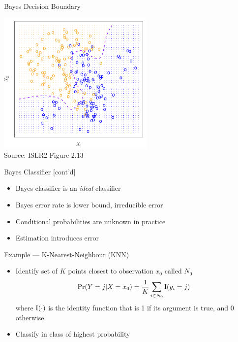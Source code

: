 \documentclass[ignorenonframetext,xcolor=x11names]{beamer}
\begin{document}
\begin{frame}{Bayes Decision Boundary}

\centering
\includegraphics[height=2.75in]{Figures_Chapters_1-6/Chapter2/2_13.pdf} \\
\vspace{3mm}
\scriptsize Source: ISLR2 Figure 2.13
\end{frame}

\begin{frame}{Bayes Classifier \small [cont'd]}
\begin{itemize}
\item Bayes classifier is an \emph{ideal} classifier
\item Bayes error rate is lower bound, irreducible error
\item Conditional probabilities are unknown in practice
\item Estimation introduces error
\end{itemize}
\end{frame}


\begin{frame}{Example --- K-Nearest-Neighbour (KNN)}
\begin{itemize}
  \item Identify set of $K$ points closest to observation $x_0$ called $N_0$
\begin{align*}
\Pr (Y=j|X=x_0) = \frac{1}{K} \sum_{i \in N_0} \operatorname{I} (y_i=j) 
\end{align*}
where $\operatorname{I}(\cdot)$ is the identity function that is 1 if its argument is true, and 0 otherwise.
\end{itemize}
\begin{itemize}
   \item Classify in class of highest probability
\end{itemize}
\end{frame}
\end{document}
